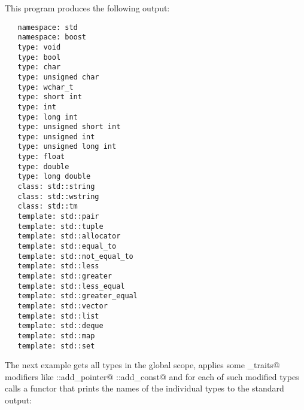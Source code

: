 This program produces the following output:

\begin{verbatim}
   namespace: std
   namespace: boost
   type: void
   type: bool
   type: char
   type: unsigned char
   type: wchar_t
   type: short int
   type: int
   type: long int
   type: unsigned short int
   type: unsigned int
   type: unsigned long int
   type: float
   type: double
   type: long double
   class: std::string
   class: std::wstring
   class: std::tm
   template: std::pair
   template: std::tuple
   template: std::allocator
   template: std::equal_to
   template: std::not_equal_to
   template: std::less
   template: std::greater
   template: std::less_equal
   template: std::greater_equal
   template: std::vector
   template: std::list
   template: std::deque
   template: std::map
   template: std::set
\end{verbatim}

The next example gets all types in the global scope,
applies some \verb@type_traits@ modifiers like \verb@std::add_pointer@
\verb@std::add_const@ and for each of such modified types calls a functor
that prints the names of the individual types to the standard output:

